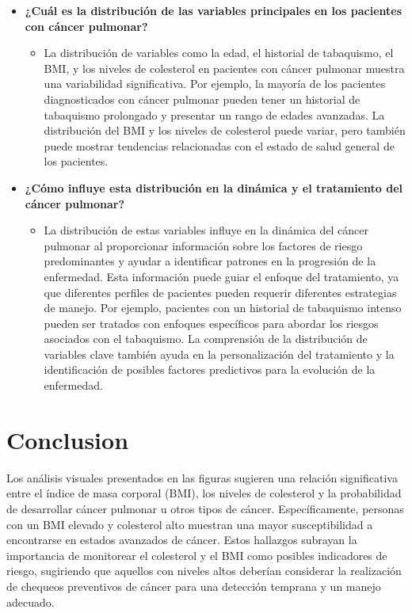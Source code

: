 \documentclass[10pt,journal,compsoc]{IEEEtran}
\begin{document}
\begin{itemize}
    \item \textbf{¿Cuál es la distribución de las variables principales en los pacientes con cáncer pulmonar?}
    \begin{itemize}
        \item La distribución de variables como la edad, el historial de tabaquismo, el BMI, y los niveles de colesterol en pacientes con cáncer pulmonar muestra una variabilidad significativa. Por ejemplo, la mayoría de los pacientes diagnosticados con cáncer pulmonar pueden tener un historial de tabaquismo prolongado y presentar un rango de edades avanzadas. La distribución del BMI y los niveles de colesterol puede variar, pero también puede mostrar tendencias relacionadas con el estado de salud general de los pacientes.
    \end{itemize}

    \item \textbf{¿Cómo influye esta distribución en la dinámica y el tratamiento del cáncer pulmonar?}
    \begin{itemize}
        \item La distribución de estas variables influye en la dinámica del cáncer pulmonar al proporcionar información sobre los factores de riesgo predominantes y ayudar a identificar patrones en la progresión de la enfermedad. Esta información puede guiar el enfoque del tratamiento, ya que diferentes perfiles de pacientes pueden requerir diferentes estrategias de manejo. Por ejemplo, pacientes con un historial de tabaquismo intenso pueden ser tratados con enfoques específicos para abordar los riesgos asociados con el tabaquismo. La comprensión de la distribución de variables clave también ayuda en la personalización del tratamiento y la identificación de posibles factores predictivos para la evolución de la enfermedad.
    \end{itemize}
\end{itemize}
\section{Conclusion}
Los análisis visuales presentados en las figuras sugieren una relación significativa entre el índice de masa corporal (BMI), los niveles de colesterol y la probabilidad de desarrollar cáncer pulmonar u otros tipos de cáncer. Específicamente, personas con un BMI elevado y colesterol alto muestran una mayor susceptibilidad a encontrarse en estados avanzados de cáncer. Estos hallazgos subrayan la importancia de monitorear el colesterol y el BMI como posibles indicadores de riesgo, sugiriendo que aquellos con niveles altos deberían considerar la realización de chequeos preventivos de cáncer para una detección temprana y un manejo adecuado.
\end{document}
